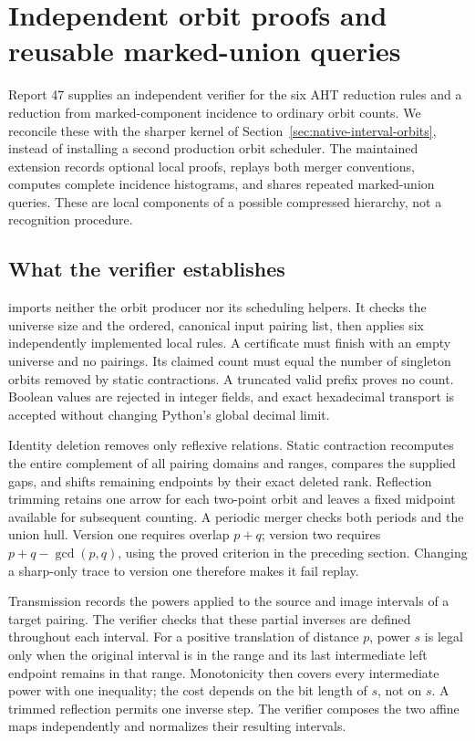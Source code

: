 \section{Independent orbit proofs and reusable marked-union queries}
\label{sec:orbit-certificates}

Report 47 supplies an independent verifier for the six AHT reduction rules
and a reduction from marked-component incidence to ordinary orbit counts.
We reconcile these with the sharper kernel of
Section~\ref{sec:native-interval-orbits}, instead of installing a second
production orbit scheduler. The maintained extension records optional local
proofs, replays both merger conventions, computes complete incidence
histograms, and shares repeated marked-union queries. These are local
components of a possible compressed hierarchy, not a recognition procedure.

\subsection{What the verifier establishes}

 imports neither the orbit
producer nor its scheduling helpers. It checks the universe size and the
ordered, canonical input pairing list, then applies six independently
implemented local rules. A certificate must finish with an empty universe
and no pairings. Its claimed count must equal the number of singleton
orbits removed by static contractions. A truncated valid prefix proves no
count. Boolean values are rejected in integer fields, and exact hexadecimal
transport is accepted without changing Python's global decimal limit.

Identity deletion removes only reflexive relations. Static contraction
recomputes the entire complement of all pairing domains and ranges,
compares the supplied gaps, and shifts remaining endpoints by their exact
deleted rank. Reflection trimming retains one arrow for each two-point
orbit and leaves a fixed midpoint available for subsequent counting.
A periodic merger checks both periods and the union hull. Version one
requires overlap $p+q$; version two requires $p+q-\gcd(p,q)$, using the
proved criterion in the preceding section. Changing a sharp-only trace
to version one therefore makes it fail replay.

Transmission records the powers applied to the source and image intervals
of a target pairing. The verifier checks that these partial inverses are
defined throughout each interval. For a positive translation of distance
$p$, power $s$ is legal only when the original interval is in the range
and its last intermediate left endpoint remains in that range. Monotonicity
then covers every intermediate power with one inequality; the cost depends
on the bit length of $s$, not on $s$. A trimmed reflection permits one
inverse step. The verifier composes the two affine maps independently and
normalizes their resulting intervals.

